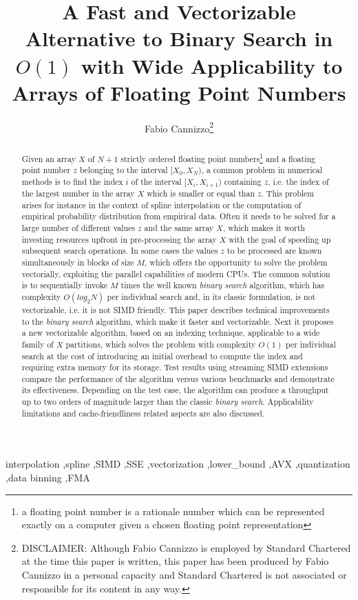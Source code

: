 \documentclass[preprint,1p,times]{elsarticle}
\begin{document}
\begin{frontmatter}
\title{A Fast and Vectorizable Alternative to Binary Search in $O(1)$ with Wide Applicability to Arrays of Floating Point Numbers}

\author{\renewcommand*{\thefootnote}{\fnsymbol{footnote}}
	Fabio Cannizzo\footnote{DISCLAIMER: Although Fabio Cannizzo is employed by Standard Chartered at the time this paper is written, this paper has been produced by Fabio Cannizzo in a personal capacity and Standard Chartered is not associated or responsible for its content in any way.}}

\begin{abstract}
Given an array $X$ of $N+1$ strictly ordered floating point numbers\footnote{a floating point number is a rationale number which can be represented exactly on a computer given a chosen floating point representation} and a floating point number $z$ belonging to the interval $[X_0,X_N)$, a common problem in numerical methods is to find the index $i$ of the interval $[X_{i},X_{i+1})$ containing $z$, i.e. the index of the largest number in the array $X$ which is smaller or equal than $z$. This problem arises for instance in the context of spline interpolation or the computation of empirical probability distribution from empirical data. Often it needs to be solved for a large number of different values $z$ and the same array $X$, which makes it worth investing resources upfront in pre-processing the array $X$ with the goal of speeding up subsequent search operations. In some cases the values $z$ to be processed are known simultaneously in blocks of size $M$, which offers the opportunity to solve the problem vectorially, exploiting the parallel capabilities of modern CPUs.
The common solution is to sequentially invoke $M$ times the well known \textit{binary search} algorithm, which has complexity $O(log_2 N)$ per individual search and, in its classic formulation, is not vectorizable, i.e. it is not SIMD friendly. This paper describes technical improvements to the \textit{binary search} algorithm, which make it faster and vectorizable. Next it proposes a new vectorizable algorithm, based on an indexing technique,  applicable to a wide family of $X$ partitions, which solves the problem with complexity $O(1)$ per individual search at the cost of introducing an initial overhead to compute the index and requiring extra memory for its storage. Test results using streaming SIMD extensions compare the performance of the algorithm versus various benchmarks and demonstrate its effectiveness. Depending on the test case, the algorithm can produce a throughput up to two orders of magnitude larger than the classic \textit{binary search}. Applicability limitations and cache-friendliness related aspects are also discussed.
\end{abstract}

\begin{keyword}
interpolation \sep spline \sep SIMD \sep SSE \sep vectorization \sep lower\_bound \sep AVX \sep quantization \sep data binning \sep FMA
\end{keyword}

\end{frontmatter}
\end{document}
